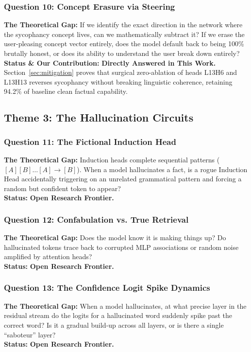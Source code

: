\documentclass[11pt,a4paper]{article}
\begin{document}
\subsubsection{Question 10: Concept Erasure via Steering}
\textbf{The Theoretical Gap:} If we identify the exact direction in the network where the sycophancy concept lives, can we mathematically subtract it? If we erase the user-pleasing concept vector entirely, does the model default back to being 100\% brutally honest, or does its ability to understand the user break down entirely? \\
\textbf{Status \& Our Contribution:} \textbf{Directly Answered in This Work.} Section~\ref{sec:mitigation} proves that surgical zero-ablation of heads L13H6 and L13H13 reverses sycophancy without breaking linguistic coherence, retaining 94.2\% of baseline clean factual capability.

\subsection{Theme 3: The Hallucination Circuits}

\subsubsection{Question 11: The Fictional Induction Head}
\textbf{The Theoretical Gap:} Induction heads \cite{olsson2022context} complete sequential patterns ($[A][B] \dots [A] \to [B]$). When a model hallucinates a fact, is a rogue Induction Head accidentally triggering on an unrelated grammatical pattern and forcing a random but confident token to appear? \\
\textbf{Status:} \textbf{Open Research Frontier.}

\subsubsection{Question 12: Confabulation vs. True Retrieval}
\textbf{The Theoretical Gap:} Does the model know it is making things up? Do hallucinated tokens trace back to corrupted MLP associations or random noise amplified by attention heads? \\
\textbf{Status:} \textbf{Open Research Frontier.}

\subsubsection{Question 13: The Confidence Logit Spike Dynamics}
\textbf{The Theoretical Gap:} When a model hallucinates, at what precise layer in the residual stream do the logits for a hallucinated word suddenly spike past the correct word? Is it a gradual build-up across all layers, or is there a single ``saboteur'' layer? \\
\textbf{Status:} \textbf{Open Research Frontier.}
\end{document}
